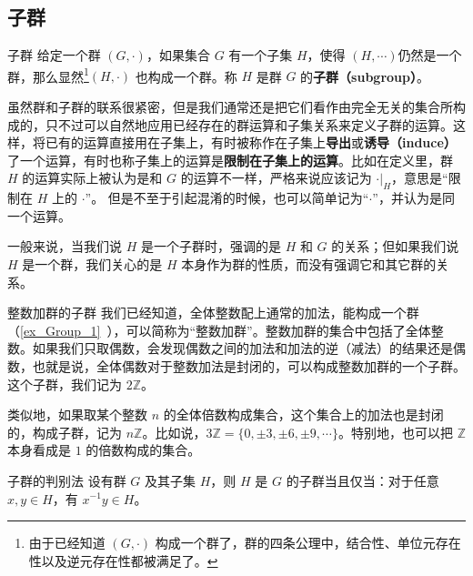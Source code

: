 

\subsection{子群}

\begin{definition}{子群}
给定一个群 $(G, \cdot)$，如果集合 $G$ 有一个子集 $H$，使得 $(H, \cdots)$仍然是一个群，那么显然\footnote{由于已经知道 $(G,\cdot)$ 构成一个群了，群的四条公理中，结合性、单位元存在性以及逆元存在性都被满足了。}$(H,\cdot)$ 也构成一个群。称 $H$ 是群 $G$ 的\textbf{子群（subgroup）}。
\end{definition}

虽然群和子群的联系很紧密，但是我们通常还是把它们看作由完全无关的集合所构成的，只不过可以自然地应用已经存在的群运算和子集关系来定义子群的运算。这样，将已有的运算直接用在子集上，有时被称作在子集上\textbf{导出}或\textbf{诱导（induce）}了一个运算，有时也称子集上的运算是\textbf{限制在子集上的运算}。比如在定义里，群 $H$ 的运算实际上被认为是和 $G$ 的运算不一样，严格来说应该记为 $\cdot|_H$，意思是“限制在 $H$ 上的 $\cdot$”。 但是不至于引起混淆的时候，也可以简单记为“$\cdot$”，并认为是同一个运算。

一般来说，当我们说 $H$ 是一个子群时，强调的是 $H$ 和 $G$ 的关系；但如果我们说 $H$ 是一个群，我们关心的是 $H$ 本身作为群的性质，而没有强调它和其它群的关系。

\begin{example}{整数加群的子群}\label{ex_Group1_1}
我们已经知道，全体整数配上通常的加法，能构成一个群（\autoref{ex_Group_1}~），可以简称为“整数加群”。整数加群的集合中包括了全体整数。如果我们只取偶数，会发现偶数之间的加法和加法的逆（减法）的结果还是偶数，也就是说，全体偶数对于整数加法是封闭的，可以构成整数加群的一个子群。这个子群，我们记为 $2\mathbb{Z}$。

类似地，如果取某个整数 $n$ 的全体倍数构成集合，这个集合上的加法也是封闭的，构成子群，记为 $n\mathbb{Z}$。比如说，$3\mathbb{Z}=\{0, \pm3, \pm6, \pm9, \cdots\}$。特别地，也可以把 $\mathbb{Z}$ 本身看成是 $1$ 的倍数构成的集合。
\end{example}

\begin{theorem}{子群的判别法}\label{the_Group1_3}
设有群 $G$ 及其子集 $H$，则 $H$ 是 $G$ 的子群当且仅当：对于任意 $x, y\in H$，有 $x^{-1}y\in H$。
\end{theorem}

